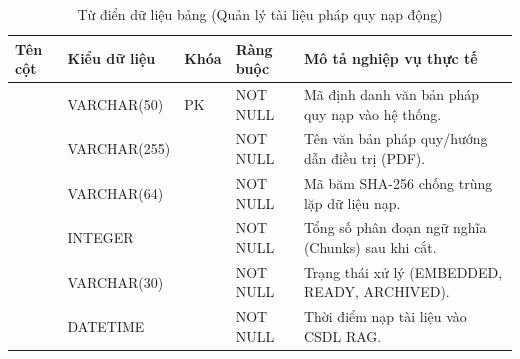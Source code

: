 \begin{table}[htbp]
\centering
\small
\begin{tabularx}{\textwidth}{L{3.5cm} L{2.2cm} C{1.2cm} C{1.8cm} Y}
\toprule
\textbf{Tên cột} & \textbf{Kiểu dữ liệu} & \textbf{Khóa} & \textbf{Ràng buộc} & \textbf{Mô tả nghiệp vụ thực tế} \\
\midrule
{} & VARCHAR(50) & PK & NOT NULL & Mã định danh văn bản pháp quy nạp vào hệ thống. \\
 & VARCHAR(255) & & NOT NULL & Tên văn bản pháp quy/hướng dẫn điều trị (PDF). \\
 & VARCHAR(64) & & NOT NULL & Mã băm SHA-256 chống trùng lặp dữ liệu nạp. \\
 & INTEGER & & NOT NULL & Tổng số phân đoạn ngữ nghĩa (Chunks) sau khi cắt. \\
 & VARCHAR(30) & & NOT NULL & Trạng thái xử lý (EMBEDDED, READY, ARCHIVED). \\
 & DATETIME & & NOT NULL & Thời điểm nạp tài liệu vào CSDL RAG. \\
\bottomrule
\end{tabularx}
\caption{Từ điển dữ liệu bảng  (Quản lý tài liệu pháp quy nạp động)}
\end{table}
